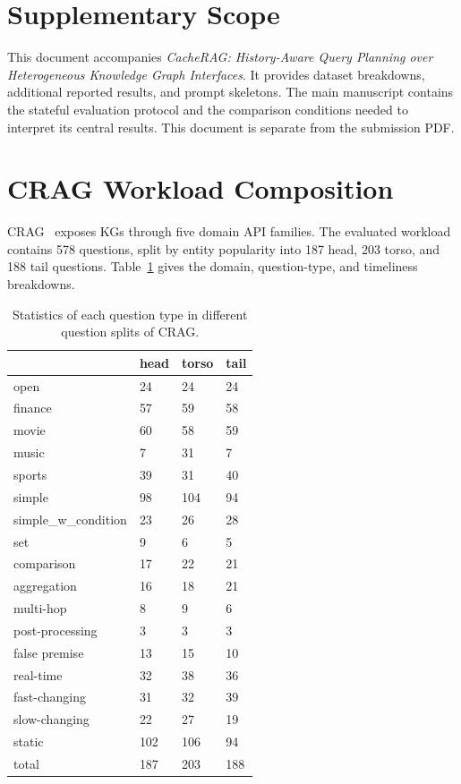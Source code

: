 \section{Supplementary Scope}
This document accompanies \emph{CacheRAG: History-Aware Query Planning over Heterogeneous Knowledge Graph Interfaces}. It provides dataset breakdowns, additional reported results, and prompt skeletons. The main manuscript contains the stateful evaluation protocol and the comparison conditions needed to interpret its central results. This document is separate from the submission PDF.

\section{CRAG Workload Composition}
CRAG~\cite{yang2024crag} exposes KGs through five domain API families. The evaluated workload contains 578 questions, split by entity popularity into 187 head, 203 torso, and 188 tail questions. Table~\ref{tab:crag-stats} gives the domain, question-type, and timeliness breakdowns.
\begin{table}[!h]
\centering
\caption{Statistics of each question type in different question splits of CRAG.}
\label{tab:crag-stats}
\begin{tabular}{llll}
\toprule
                     & \textbf{head} & \textbf{torso} & \textbf{tail} \\
\midrule
open                 &  24  & 24   & 24   \\
finance              & 57  &  59  &  58 \\
movie                & 60  & 58   & 59  \\
music                &  7  &  31   &   7 \\
sports               &  39  &  31   &  40  \\
\midrule
simple               & 98  &  104  &  94 \\
simple\_w\_condition & 23   &  26   & 28   \\
set                  &  9  &  6   & 5   \\
comparison           &  17  & 22    & 21   \\
aggregation          & 16   & 18    & 21   \\
multi-hop            &  8  &  9   &   6 \\
post-processing      &  3   &   3   &   3  \\
false premise        &  13  & 15    & 10   \\
\midrule
real-time            & 32   &  38   &  36  \\
fast-changing        &  31  &  32   &   39 \\
slow-changing        &  22  &  27   &  19  \\
static               & 102  &  106  &  94 \\
\midrule
total               & 187 & 203 & 188 \\
\bottomrule
\end{tabular}
\end{table}

